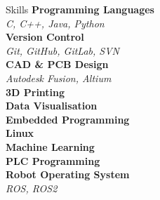 \documentclass{custom-resume}
\begin{document}
{\begin{minipage}[t][23cm]{\leftouterwidth}
\begin{minipage}[t][23cm]{\leftinnerwidth}

    \begin{section*}{Skills}
      \textbf{Programming Languages} \\[2pt]
      \textit{C, C++, Java, Python} \\[12pt]

      \textbf{Version Control} \\[2pt]
      \textit{Git, GitHub, GitLab, SVN} \\[12pt]

      \textbf{CAD \& PCB Design} \\[2pt]
      \textit{Autodesk Fusion, Altium} \\[12pt]

      \textbf{3D Printing} \\[12pt]

      \textbf{Data Visualisation} \\[12pt]

      \textbf{Embedded Programming} \\[12pt]

      \textbf{Linux} \\[12pt]

      \textbf{Machine Learning} \\[12pt]

      \textbf{PLC Programming} \\[12pt]

      \textbf{Robot Operating System} \\[2pt]
      \textit{ROS, ROS2}
    \end{section*}

  \end{minipage}
\end{minipage}}%
\hspace{\innerspacing}%
\end{document}
